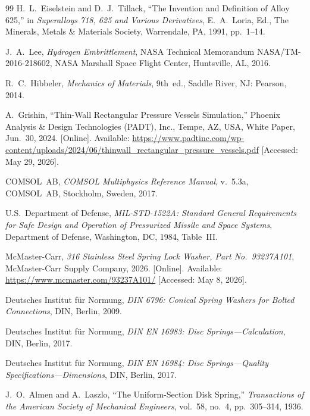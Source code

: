 \documentclass[12pt, letterpaper]{report}%
\begin{document}
\begin{thebibliography}{99}
	H.\ L.\ Eiselstein and D.\ J.\ Tillack,
	``The Invention and Definition of Alloy 625,''
	in \textit{Superalloys 718, 625 and Various Derivatives},
	E.\ A.\ Loria, Ed., The Minerals, Metals \& Materials Society,
	Warrendale, PA, 1991, pp.~1--14.

	J.\ A.\ Lee, \textit{Hydrogen Embrittlement},
	NASA Technical Memorandum NASA/TM-2016-218602,
	NASA Marshall Space Flight Center, Huntsville, AL, 2016.

	R.\ C.\ Hibbeler, \textit{Mechanics of Materials},
	9th~ed., Saddle River, NJ: Pearson, 2014.

	A.\ Grishin, ``Thin-Wall Rectangular Pressure Vessels Simulation,''
	Phoenix Analysis \& Design Technologies (PADT), Inc.,
	Tempe, AZ, USA, White Paper, Jun.\ 30, 2024. [Online].
	Available: \url{https://www.padtinc.com/wp-content/uploads/2024/06/thinwall_rectangular_pressure_vessels.pdf}
	[Accessed: May 29, 2026].

	COMSOL~AB, \textit{COMSOL Multiphysics\textregistered{} Reference Manual},
	v.~5.3a, COMSOL~AB, Stockholm, Sweden, 2017.

	U.S.\ Department of Defense,
	\textit{MIL-STD-1522A: Standard General Requirements for Safe Design and
	Operation of Pressurized Missile and Space Systems},
	Department of Defense, Washington, DC, 1984, Table~III.

	McMaster-Carr, \textit{316 Stainless Steel Spring Lock Washer,
	Part No.\ 93237A101}, McMaster-Carr Supply Company, 2026. [Online].
	Available: \url{https://www.mcmaster.com/93237A101/}
	[Accessed: May 8, 2026].

	Deutsches Institut f\"{u}r Normung,
	\textit{DIN 6796: Conical Spring Washers for Bolted Connections},
	DIN, Berlin, 2009.

	Deutsches Institut f\"{u}r Normung,
	\textit{DIN EN 16983: Disc Springs---Calculation}, DIN, Berlin, 2017.

	Deutsches Institut f\"{u}r Normung,
	\textit{DIN EN 16984: Disc Springs---Quality Specifications---Dimensions},
	DIN, Berlin, 2017.

	J.\ O.\ Almen and A.\ Laszlo,
	``The Uniform-Section Disk Spring,''
	\textit{Transactions of the American Society of Mechanical Engineers},
	vol.~58, no.~4, pp.~305--314, 1936.


\end{thebibliography}
\end{document}

